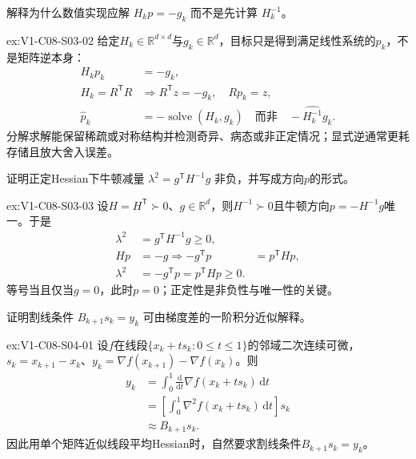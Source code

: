 \begin{SLChapterExercisePairSection}
\begin{exercise}\label{ex:V1-C08-S03-02}
解释为什么数值实现应解 $H_kp=-g_k$ 而不是先计算 $H_k^{-1}$。
\end{exercise}
\label{sol:V1-C08-S03-02}
\begin{chapterexercisesolution}{ex:V1-C08-S03-02}
给定$H_k\in\mathbb R^{d\times d}$与$g_k\in\mathbb R^d$，目标只是得到满足线性系统的$p_k$，不是矩阵逆本身：
\[
\begin{aligned}
H_kp_k&=-g_k,\\
H_k=R^{\mathsf T}R
&\Longrightarrow
R^{\mathsf T}z=-g_k,\quad Rp_k=z,\\
\widehat p_k&=-\operatorname{solve}(H_k,g_k)
\quad\text{而非}\quad -\widehat{H_k^{-1}}g_k.
\end{aligned}
\]
分解求解能保留稀疏或对称结构并检测奇异、病态或非正定情况；显式逆通常更耗存储且放大舍入误差。
\end{chapterexercisesolution}

\begin{exercise}\label{ex:V1-C08-S03-03}
证明正定Hessian下牛顿减量 $\lambda^2=g^{\mathsf T}H^{-1}g$ 非负，并写成方向$p$的形式。
\end{exercise}
\label{sol:V1-C08-S03-03}
\begin{chapterexercisesolution}{ex:V1-C08-S03-03}
设$H=H^{\mathsf T}\succ0$、$g\in\mathbb R^d$，则$H^{-1}\succ0$且牛顿方向$p=-H^{-1}g$唯一。于是
\[
\begin{aligned}
\lambda^2&=g^{\mathsf T}H^{-1}g\ge0,\\
Hp&=-g
\Longrightarrow -g^{\mathsf T}p&=p^{\mathsf T}Hp,\\
\lambda^2&=-g^{\mathsf T}p=p^{\mathsf T}Hp\ge0.
\end{aligned}
\]
等号当且仅当$g=0$，此时$p=0$；正定性是非负性与唯一性的关键。
\end{chapterexercisesolution}

\begin{exercise}\label{ex:V1-C08-S04-01}
证明割线条件 $B_{k+1}s_k=y_k$ 可由梯度差的一阶积分近似解释。
\end{exercise}
\label{sol:V1-C08-S04-01}
\begin{chapterexercisesolution}{ex:V1-C08-S04-01}
设$f$在线段$\{x_k+t s_k:0\le t\le1\}$的邻域二次连续可微，$s_k=x_{k+1}-x_k$、$y_k=\nabla f(x_{k+1})-\nabla f(x_k)$。则
\[
\begin{aligned}
y_k
&=\int_0^1\frac{\mathrm d}{\mathrm dt}
\nabla f(x_k+t s_k)\,\mathrm dt\\
&=\left[\int_0^1\nabla^2f(x_k+t s_k)\,\mathrm dt\right]s_k\\
&\approx B_{k+1}s_k.
\end{aligned}
\]
因此用单个矩阵近似线段平均Hessian时，自然要求割线条件$B_{k+1}s_k=y_k$。
\end{chapterexercisesolution}


\end{SLChapterExercisePairSection}
